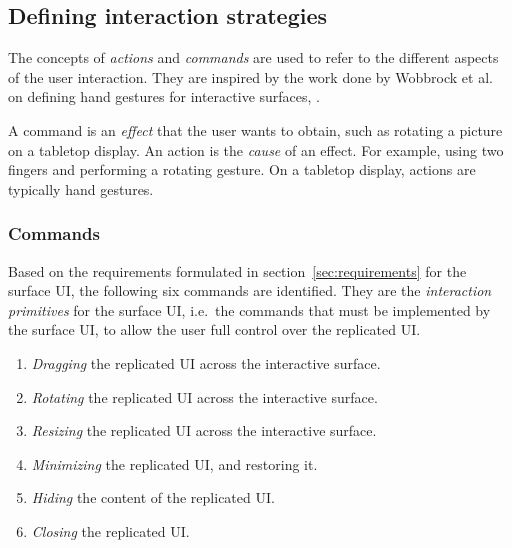 

\subsection{Defining interaction strategies}
\label{sec:strategies}

The concepts of \emph{actions} and \emph{commands} are used to refer to the different aspects of the user interaction.
They are inspired by the work done by Wobbrock et al. on defining hand gestures for interactive surfaces, \citep{Wobbrock:2009:gestures}.

A command is an \emph{effect} that the user wants to obtain, such as rotating a picture on a tabletop display.
An action is the \emph{cause} of an effect.
For example, using two fingers and performing a rotating gesture.
On a tabletop display, actions are typically hand gestures.


\subsubsection{Commands}

Based on the requirements formulated in section~\ref{sec:requirements} for the surface UI, the following six commands are identified.
They are the \emph{interaction primitives} for the surface UI, i.e.\ the commands that must be implemented by the surface UI, to allow the user full control over the replicated UI.

\begin{enumerate}
\item{\emph{Dragging} the replicated UI across the interactive surface.}
\item{\emph{Rotating} the replicated UI across the interactive surface.}
\item{\emph{Resizing} the replicated UI across the interactive surface.}
\item{\emph{Minimizing} the replicated UI, and restoring it.}
\item{\emph{Hiding} the content of the replicated UI.}
\item{\emph{Closing} the replicated UI.}
\end{enumerate}

